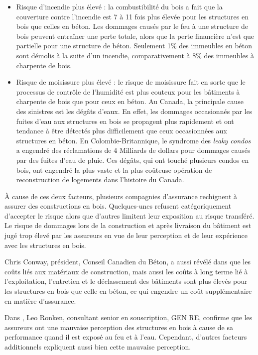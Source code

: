 \documentclass[11pt]{article}
\begin{document}
\begin{itemize}
\item Risque d'incendie plus élevé : la combustibilité du bois a fait que la couverture contre l'incendie est 7 à 11 fois plus élevée pour les structures en bois que celles en béton. Les dommages causés par le feu à une structure de bois peuvent entraîner une perte totale, alors que la perte financière n'est que partielle pour une structure de béton. Seulement 1\% des immeubles en béton sont démolis à la suite d'un incendie, comparativement à 8\% des immeubles à charpente de bois.
\item Risque de moisissure plus élevé : le risque de moisissure fait en sorte que le processus de contrôle de l'humidité est plus couteux pour les bâtiments à charpente de bois que pour ceux en béton. Au Canada, la principale cause des sinistres est les dégâts d'eaux. En effet, les dommages occasionnés par les fuites d'eau aux structures en bois se propagent plus rapidement et ont tendance à être détectés plus difficilement que ceux occasionnées aux structures en béton. En Colombie-Britannique, le syndrome des \textit{leaky condos} a engendré des réclamations de 4 Milliards de dollars pour dommages causés par des fuites d'eau de pluie. Ces dégâts, qui ont touché plusieurs condos en bois, ont engendré la plus vaste et la plus coûteuse opération de reconstruction de logements dans l'histoire du Canada.
\end{itemize}

À cause de ces deux facteurs, plusieurs compagnies d'assurance rechignent à assurer des constructions en bois. Quelques-unes refusent catégoriquement d'accepter le risque alors que d'autres limitent leur exposition au risque transféré. Le risque de dommages lors de la construction et après livraison du bâtiment est jugé trop élevé par les assureurs en vue de leur perception et de leur expérience avec les structures en bois.

Chris Conway, président, Conseil Canadien du Béton, a aussi révélé dans \cite{GLOBEADVISORS2} que les coûts liés aux matériaux de construction, mais aussi les coûts à long terme lié à l'exploitation, l'entretien et le déclassement des bâtiments sont plus élevés pour les structures en bois que celle en béton, ce qui engendre un coût supplémentaire en matière d'assurance.

Dans \cite{LeoRonken}, Leo Ronken, consultant senior en souscription, GEN RE, confirme que les assureurs ont une mauvaise perception des structures en bois à cause de sa performance quand il est exposé au feu et à l'eau. Cependant, d'autres facteurs additionnels expliquent aussi bien cette mauvaise perception.
\end{document}
